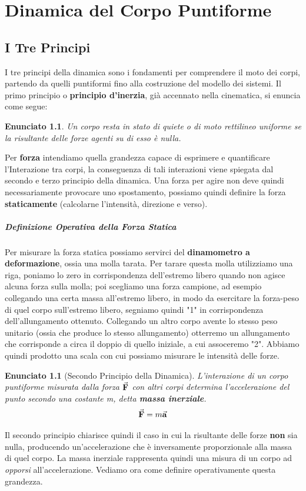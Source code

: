 \documentclass{report}
\newtheorem{enunc}[defn]{Enunciato}
\renewcommand{\a}{\va{a}}
\newcommand{\F}{\va{F}}
\begin{document}
\chapter{Dinamica del Corpo Puntiforme}
\section{I Tre Principi}
I tre principi della dinamica sono i fondamenti per comprendere il moto dei corpi, partendo da quelli puntiformi fino alla costruzione del modello dei sistemi. 
Il primo principio o \textbf{principio d'inerzia}, già accennato nella cinematica, si enuncia come segue:
\begin{enunc}
Un corpo resta in stato di quiete o di moto rettilineo uniforme se la risultante delle forze agenti su di esso è nulla.
\end{enunc}
Per \textbf{forza} intendiamo quella grandezza capace di esprimere e quantificare l'Interazione tra corpi, la conseguenza di tali interazioni viene spiegata dal secondo e terzo principio della dinamica. Una forza per agire non deve quindi necessariamente provocare uno spostamento, possiamo quindi definire la forza \textbf{staticamente} (calcolarne l'intensità, direzione e verso).
\paragraph{Definizione Operativa della Forza Statica}
Per misurare la forza statica possiamo servirci del \textbf{dinamometro a deformazione}, ossia una molla tarata. Per tarare questa molla utilizziamo una riga, poniamo lo zero in corrispondenza dell'estremo libero quando non agisce alcuna forza sulla molla; poi scegliamo una forza campione, ad esempio collegando una certa massa all'estremo libero, in modo da esercitare la forza-peso di quel corpo sull'estremo libero, segniamo quindi "1" in corrispondenza dell'allungamento ottenuto. Collegando un altro corpo avente lo stesso peso unitario (ossia che produce lo stesso allungamento) otterremo un allungamento che corrisponde a circa il doppio di quello iniziale, a cui assoceremo "2". Abbiamo quindi prodotto una scala con cui possiamo misurare le intensità delle forze. 
\begin{enunc}[Secondo Principio della Dinamica]
L'interazione di un corpo puntiforme misurata dalla forza $\F$ con altri corpi determina l'accelerazione del punto secondo una costante \textit{m}, detta \textbf{massa inerziale}.
\[\F=m\a\]
\end{enunc}
Il secondo principio chiarisce quindi il caso in cui la risultante delle forze \textbf{non} sia nulla, producendo un'accelerazione che è inversamente proporzionale alla massa di quel corpo. La massa inerziale rappresenta quindi una misura di un corpo ad \textit{opporsi} all'accelerazione. Vediamo ora come definire operativamente questa grandezza.
\end{document}
